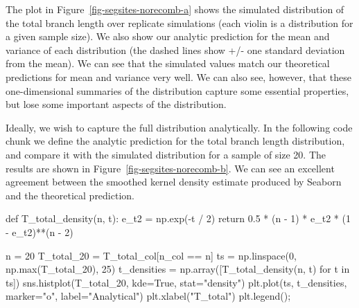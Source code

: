 \documentclass[graybox]{svmult}
\begin{document}


    The plot in Figure~\ref{fig-segsites-norecomb-a} shows the simulated
distribution of the total branch length
over replicate simulations (each violin is a distribution for a given
sample size). We also show our analytic prediction for the mean and
variance of each distribution (the dashed lines show +/- one standard
deviation from the mean). We can see that the simulated values match our theoretical
predictions for mean and variance very well. We can also see, however,
that these one-dimensional summaries of the distribution capture some
essential properties, but lose some important aspects of the
distribution.

    Ideally, we wish to capture the full distribution analytically. In the following code chunk we define the analytic
prediction for the total branch length distribution, and compare it with the simulated distribution for a sample of size 20. The results are shown in
Figure~\ref{fig-segsites-norecomb-b}. We can see an excellent agreement between
the smoothed kernel
density estimate produced by Seaborn and the theoretical prediction.

\begin{pythoncode}
def T_total_density(n, t):
    e_t2 = np.exp(-t / 2)
    return 0.5 * (n - 1) * e_t2 * (1 - e_t2)**(n - 2)

n = 20
T_total_20 = T_total_col[n_col == n]
ts = np.linspace(0, np.max(T_total_20), 25)
t_densities = np.array([T_total_density(n, t) for t in ts])
sns.histplot(T_total_20, kde=True, stat="density")
plt.plot(ts, t_densities, marker="o", label="Analytical")
plt.xlabel("T_total")
plt.legend();
\end{pythoncode}
\end{document}
